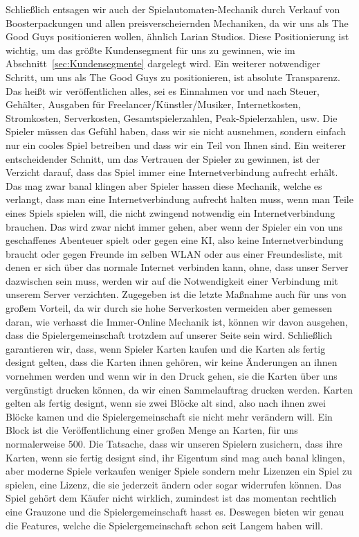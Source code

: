 \documentclass[fontsize=11, a4aper]{scrartcl}
\begin{document}
\noindent Schließlich entsagen wir auch der Spielautomaten-Mechanik durch Verkauf von Boosterpackungen und allen preisverscheiernden Mechaniken, da wir uns als \glqq The Good Guys\grqq{} positionieren wollen, ähnlich Larian Studios. Diese Positionierung ist wichtig, um das größte Kundensegment für uns zu gewinnen, wie im Abschnitt~\ref{sec:Kundensegmente} dargelegt wird. Ein weiterer notwendiger Schritt, um uns als \glqq The Good Guys\grqq{} zu positionieren, ist absolute Transparenz. Das heißt wir veröffentlichen alles, sei es Einnahmen vor und nach Steuer, Gehälter, Ausgaben für Freelancer/Künstler/Musiker, Internetkosten, Stromkosten, Serverkosten, Gesamtspielerzahlen, Peak-Spielerzahlen, usw. Die Spieler müssen das Gefühl haben, dass wir sie nicht ausnehmen, sondern einfach nur ein cooles Spiel betreiben und dass wir ein Teil von Ihnen sind. Ein weiterer entscheidender Schnitt, um das Vertrauen der Spieler zu gewinnen, ist der Verzicht darauf, dass das Spiel immer eine Internetverbindung aufrecht erhält. Das mag zwar banal klingen aber Spieler hassen diese Mechanik, welche es verlangt, dass man eine Internetverbindung aufrecht halten muss, wenn man Teile eines Spiels spielen will, die nicht zwingend notwendig ein Internetverbindung brauchen. Das wird zwar nicht immer gehen, aber wenn der Spieler ein von uns geschaffenes Abenteuer spielt oder gegen eine KI, also keine Internetverbindung braucht oder gegen Freunde im selben WLAN oder aus einer Freundesliste, mit denen er sich über das normale Internet verbinden kann, ohne, dass unser Server dazwischen sein muss, werden wir auf die Notwendigkeit einer Verbindung mit unserem Server verzichten. Zugegeben ist die letzte Maßnahme auch für uns von großem Vorteil, da wir durch sie hohe Serverkosten vermeiden aber gemessen daran, wie verhasst die Immer-Online Mechanik ist, können wir davon ausgehen, dass die Spielergemeinschaft trotzdem auf unserer Seite sein wird. Schließlich garantieren wir, dass, wenn Spieler Karten kaufen und die Karten als fertig designt gelten, dass die Karten ihnen gehören, wir keine Änderungen an ihnen vornehmen werden und wenn wir in den Druck gehen, sie die Karten über uns vergünstigt drucken können, da wir einen Sammelauftrag drucken werden. Karten gelten als fertig designt, wenn sie zwei Blöcke alt sind, also nach ihnen zwei Blöcke kamen und die Spielergemeinschaft sie nicht mehr verändern will. Ein Block ist die Veröffentlichung einer großen Menge an Karten, für uns normalerweise 500. Die Tatsache, dass wir unseren Spielern zusichern, dass ihre Karten, wenn sie fertig designt sind, ihr Eigentum sind mag auch banal klingen, aber moderne Spiele verkaufen weniger Spiele sondern mehr Lizenzen ein Spiel zu spielen, eine Lizenz, die sie jederzeit ändern oder sogar widerrufen können. Das Spiel gehört dem Käufer nicht wirklich, zumindest ist das momentan rechtlich eine Grauzone und die Spielergemeinschaft hasst es. Deswegen bieten wir genau die Features, welche die Spielergemeinschaft schon seit Langem haben will.\hfill\newline
\end{document}
